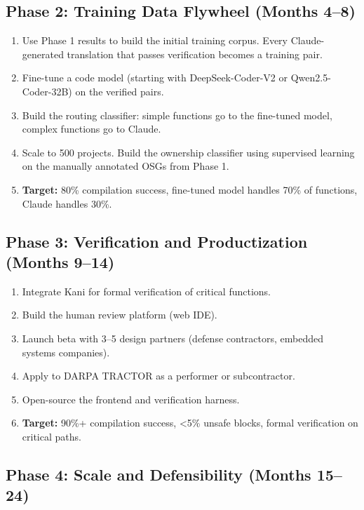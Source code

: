 \documentclass[11pt,a4paper]{article}
\theoremstyle{definition}
\theoremstyle{remark}
\begin{document}
\subsection{Phase 2: Training Data Flywheel (Months 4--8)}

\begin{enumerate}[leftmargin=2em]
\item Use Phase 1 results to build the initial training corpus. Every Claude-generated translation that passes verification becomes a training pair.
\item Fine-tune a code model (starting with DeepSeek-Coder-V2 or Qwen2.5-Coder-32B) on the verified pairs.
\item Build the routing classifier: simple functions go to the fine-tuned model, complex functions go to Claude.
\item Scale to 500 projects. Build the ownership classifier using supervised learning on the manually annotated OSGs from Phase 1.
\item \textbf{Target:} 80\% compilation success, fine-tuned model handles 70\% of functions, Claude handles 30\%.
\end{enumerate}

\subsection{Phase 3: Verification and Productization (Months 9--14)}

\begin{enumerate}[leftmargin=2em]
\item Integrate Kani for formal verification of critical functions.
\item Build the human review platform (web IDE).
\item Launch beta with 3--5 design partners (defense contractors, embedded systems companies).
\item Apply to DARPA TRACTOR as a performer or subcontractor.
\item Open-source the frontend and verification harness.
\item \textbf{Target:} 90\%+ compilation success, \textless 5\% unsafe blocks, formal verification on critical paths.
\end{enumerate}

\subsection{Phase 4: Scale and Defensibility (Months 15--24)}
\end{document}
